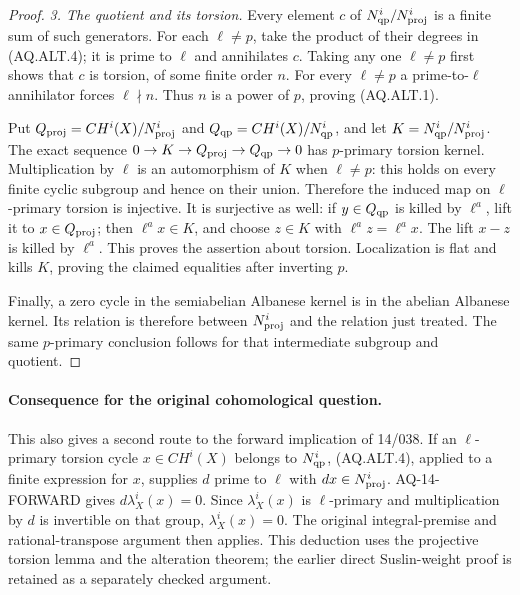 \documentclass[11pt,a4paper]{article}
\theoremstyle{definition}\newtheorem{definition}[theorem]{Definition}
\theoremstyle{remark}\newtheorem{remark}[theorem]{Remark}
\begin{document}
\begin{proof}
\emph{3. The quotient and its torsion.}
Every element $c$ of $N^i_{\rm qp}/N^i_{\rm proj}$
is a finite sum of such generators.  For each
$\ell\ne p$, take the product of their degrees in
(AQ.ALT.4); it is prime to $\ell$ and annihilates $c$.
Taking any one $\ell\ne p$ first shows that $c$ is
torsion, of some finite order $n$.  For every
$\ell\ne p$ a prime-to-$\ell$ annihilator forces
$\ell\nmid n$.  Thus $n$ is a power of $p$, proving
(AQ.ALT.1).

Put $Q_{\rm proj}=CH^i(X)/N^i_{\rm proj}$ and
$Q_{\rm qp}=CH^i(X)/N^i_{\rm qp}$, and let
$K=N^i_{\rm qp}/N^i_{\rm proj}$.
The exact sequence
$0\to K\to Q_{\rm proj}\to Q_{\rm qp}\to0$
has $p$-primary torsion kernel.  Multiplication by
$\ell$ is an automorphism of $K$ when $\ell\ne p$:
this holds on every finite cyclic subgroup and hence
on their union.  Therefore the induced map on
$\ell$-primary torsion is injective.  It is surjective
as well: if $y\in Q_{\rm qp}$ is killed by
$\ell^a$, lift it to $x\in Q_{\rm proj}$;
then $\ell^a x\in K$, and choose $z\in K$ with
$\ell^a z=\ell^a x$.  The lift $x-z$ is killed by
$\ell^a$.  This proves the assertion about torsion.
Localization is flat and kills $K$, proving the
claimed equalities after inverting $p$.

Finally, a zero cycle in the semiabelian Albanese
kernel is in the abelian Albanese kernel.  Its relation
is therefore between $N^i_{\rm proj}$ and the relation
just treated.  The same $p$-primary conclusion follows
for that intermediate subgroup and quotient.
\end{proof}

\paragraph{Consequence for the original cohomological question.}
This also gives a second route to the forward implication
of 14/038.  If an $\ell$-primary torsion cycle
$x\in CH^i(X)$ belongs to $N^i_{\rm qp}$, (AQ.ALT.4),
applied to a finite expression for $x$, supplies
$d$ prime to $\ell$ with $dx\in N^i_{\rm proj}$.
AQ-14-FORWARD gives $d\lambda_X^i(x)=0$.
Since $\lambda_X^i(x)$ is $\ell$-primary and
multiplication by $d$ is invertible on that group,
$\lambda_X^i(x)=0$.
The original integral-premise and rational-transpose
argument then applies.  This deduction uses the
projective torsion lemma and the alteration theorem;
the earlier direct Suslin-weight proof is retained
as a separately checked argument.
\end{document}
